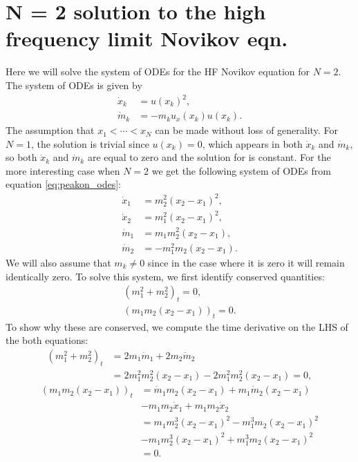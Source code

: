 \documentclass[english,master]{liumaiex}
\theoremstyle{plain}
\theoremstyle{definition}
\begin{document}
\section{N = 2 solution to the high frequency limit Novikov eqn.}
Here we will solve the system of ODEs for the HF Novikov equation for $N = 2$. The system of ODEs is given by
\begin{equation}
\begin{aligned}
	\dot{x}_k &= u(x_k)^2, \\
	\dot{m}_k &= -m_k u_x(x_k)u(x_k).
\end{aligned}
\end{equation}
The assumption that $x_1 < \cdots < x_N$ can be made without loss of generality. For $N = 1$, the solution is trivial since $u(x_k) = 0$, which appears in both $\dot{x}_k$ and $\dot{m}_k$, so both $\dot{x}_k$ and $\dot{m}_k$ are equal to zero and the solution for is constant. For the more interesting case when $N = 2$ we get the following system of ODEs from equation \eqref{eq:peakon_odes}:
%
\begin{align}
	\dot{x}_1 & = m_2^2 (x_2 - x_1)^2, \\
	\dot{x}_2 & = m_1^2 (x_2 - x_1)^2, \\
	\dot{m}_1 & = m_1 m_2^2(x_2 - x_1),  \\
	\dot{m}_2 & = -m_1^2 m_2(x_2 - x_1).
\end{align}
%
We will also assume that $m_k \neq 0$ since in the case where it is zero it will remain identically zero.
%
To solve this system, we first identify conserved quantities:
\begin{align}
	(m_1^2 + m_2^2)_t = 0, \\
	(m_1m_2(x_2 - x_1))_t = 0.
\end{align}
%
To show why these are conserved, we compute the time derivative on the LHS of the both equations:
\begin{equation}
\begin{aligned}
	(m_1^2 + m_2^2)_t 
	&= 2m_1\dot{m}_1 + 2m_2\dot{m}_2 \\
	&= 2m_1^2m_2^2(x_2 - x_1) - 2m_1^2m_2^2(x_2 - x_1) = 0,
\end{aligned}
\end{equation}
\begin{equation}
\begin{aligned}
	(m_1m_2(x_2 - x_1))_t 
	&= \dot{m}_1m_2(x_2 - x_1) + m_1\dot{m}_2(x_2 - x_1) \\
	&- m_1m_2\dot{x}_1 + m_1m_2\dot{x}_2 \\
	&= m_1m_2^3(x_2 - x_1)^2 - m_1^3m_2(x_2 - x_1)^2 \\
	&- m_1m_2^3(x_2 - x_1)^2 + m_1^3m_2(x_2 - x_1)^2 \\
	&= 0. \\
\end{aligned}
\end{equation}
\end{document}
